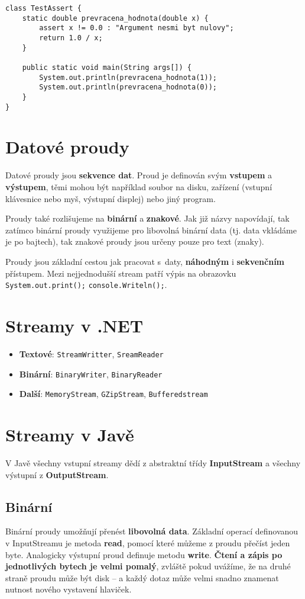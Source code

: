 \begin{verbatim}
class TestAssert { 
	static double prevracena_hodnota(double x) { 
		assert x != 0.0 : "Argument nesmi byt nulovy"; 
		return 1.0 / x; 
	}    
	
	public static void main(String args[]) { 
		System.out.println(prevracena_hodnota(1)); 
		System.out.println(prevracena_hodnota(0)); 
	} 
}
\end{verbatim}

\section{Datové proudy}
Datové proudy jsou \textbf{sekvence dat}. Proud je definován svým \textbf{vstupem} a \textbf{výstupem}, těmi mohou být například soubor na disku, zařízení (vstupní klávesnice nebo myš, výstupní displej) nebo jiný program.

Proudy také rozlišujeme na \textbf{binární} a \textbf{znakové}. Jak již názvy napovídají, tak zatímco binární proudy využijeme pro libovolná binární data (tj. data vkládáme je po bajtech), tak znakové proudy jsou určeny pouze pro text (znaky).

Proudy jsou základní cestou jak pracovat s daty, \textbf{náhodným} i \textbf{sekvenčním} přístupem. Mezi nejjednodušší stream patří výpis na obrazovku \texttt{System.out.print();} \texttt{console.Writeln();}.

\section{Streamy v .NET}
\begin{itemize}
    \item \textbf{Textové}: \texttt{StreamWritter}, \texttt{SreamReader}
    \item \textbf{Binární}:	 \texttt{BinaryWriter},	 \texttt{BinaryReader}
    \item \textbf{Další}:	 \texttt{MemoryStream},	 \texttt{GZipStream},		 \texttt{Bufferedstream}
\end{itemize}

\section{Streamy v Javě}
V Javě všechny vstupní streamy dědí z abstraktní třídy \textbf{InputStream} a všechny výstupní z \textbf{OutputStream}.

\subsection{Binární}
Binární proudy umožňují přenést \textbf{libovolná data}. Základní operací definovanou v InputStreamu je metoda \textbf{read}, pomocí které můžeme z proudu přečíst jeden byte. Analogicky výstupní proud definuje metodu \textbf{write}. \textbf{Čtení a zápis po jednotlivých bytech je velmi pomalý}, zvláště pokud uvážíme, že na druhé straně proudu může být disk – a každý dotaz může velmi snadno znamenat nutnost nového vystavení hlaviček.


